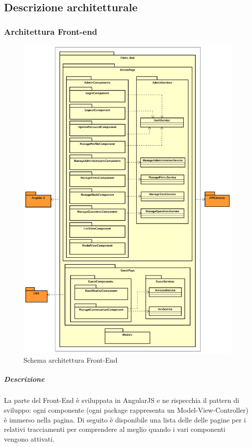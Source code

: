 \documentclass[../DefinizioneDiProdotto_v2.0.0.tex]{subfiles}
\begin{document}
\subsection{Descrizione architetturale}
\subsubsection{Architettura Front-end}
\begin{figure}[h]
	\centering
	\includegraphics[scale=0.2]{Architettura/Front-end.png}
	\caption{Schema architettura Front-End}
\end{figure}

\subparagraph{Descrizione}	La parte del Front-End è sviluppata in AngularJS e ne rispecchia il pattern di sviluppo: ogni componente (ogni package rappresenta un Model-View-Controller) è immerso nella pagina. Di seguito è disponibile una lista delle  delle pagine per i relativi tracciamenti per comprendere al meglio quando i vari componenti vengono attivati. \\
\end{document}
